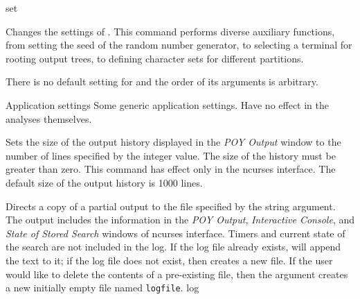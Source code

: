 \begin{command}{set}{}


	\begin{poydescription}
            Changes the settings of \poy. This command performs diverse auxiliary 
            functions, from setting the seed of the random number generator, to
            selecting a terminal for rooting output trees, to defining character sets
            for different partitions.
            
            There is no default setting for  and the order of its
            arguments is arbitrary.
            
	\end{poydescription}

	\begin{arguments}

        \begin{argumentgroup}{Application settings}
            {Some generic application settings. Have no effect in the analyses
            themselves.}
             
                {Sets the size of the \poy output history displayed in the
                \emph{POY Output} window to the number of lines specified by the
                integer value. The size of the history must be greater than
                zero. This command has effect only in the ncurses interface. The
                default size of the output history is 1000 lines.}
                 {}

                {Directs a copy of a partial output to the file specified by the
                string  argument. The output includes the  information in the
                \emph{POY Output}, \emph{Interactive Console}, and \emph{State
                of Stored Search} windows of ncurses interface.  Timers and
                current state of the search are not included in the log. If the
                log
                file already exists, \poy will append the text to it; if the log
                file does not exist, then \poy creates a new file. If the user
                would like to delete the contents of a pre-existing file, then
                the argument  creates a new
                initially empty file named \texttt{logfile}.}
                {log}


\end{argumentgroup}
\end{arguments}
\end{command}
